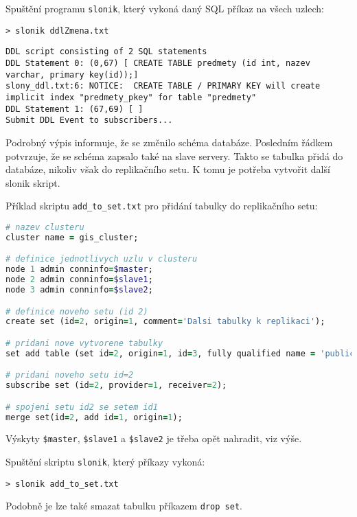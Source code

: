 Spuštění programu \texttt{slonik}, který vykoná daný SQL příkaz na všech uzlech:

\begin{lstlisting}
> slonik ddlZmena.txt
\end{lstlisting}
\begin{lstlisting}[identifierstyle=\color{black},stringstyle=\color{black},keywordstyle=\color{black}]
DDL script consisting of 2 SQL statements
DDL Statement 0: (0,67) [ CREATE TABLE predmety (id int, nazev varchar, primary key(id));]
slony_ddl.txt:6: NOTICE:  CREATE TABLE / PRIMARY KEY will create implicit index "predmety_pkey" for table "predmety"
DDL Statement 1: (67,69) [ ]
Submit DDL Event to subscribers...
\end{lstlisting}

Podrobný výpis informuje, že se změnilo schéma databáze. Posledním řádkem
potvrzuje, že se schéma zapsalo také na slave servery. Takto se tabulka přidá do
databáze, nikoliv však do replikačního setu. K tomu je potřeba vytvořit
další slonik skript.

Příklad skriptu \texttt{add\_to\_set.txt} pro přidání tabulky do replikačního
setu:

\begin{lstlisting}[language=ruby]
# nazev clusteru
cluster name = gis_cluster;

# definice jednotlivych uzlu v clusteru
node 1 admin conninfo=$master;
node 2 admin conninfo=$slave1;
node 3 admin conninfo=$slave2;

# definice noveho setu (id 2)
create set (id=2, origin=1, comment='Dalsi tabulky k replikaci');

# pridani nove vytvorene tabulky
set add table (set id=2, origin=1, id=3, fully qualified name = 'public.predmet', comment='seznam predmetu');

# pridani noveho setu id=2
subscribe set (id=2, provider=1, receiver=2);

# spojeni setu id2 se setem id1
merge set(id=2, add id=1, origin=1);
\end{lstlisting}
Výskyty \texttt{\$master}, \texttt{\$slave1} a \texttt{\$slave2} je třeba opět
nahradit, viz výše.

Spuštění skriptu \texttt{slonik}, který příkazy vykoná:

\begin{lstlisting}
> slonik add_to_set.txt
\end{lstlisting}

Podobně je lze také smazat tabulku příkazem \texttt{drop set}. 

